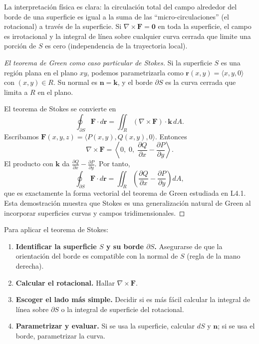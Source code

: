 \begin{rem}
La interpretación física es clara: la circulación total del campo alrededor del borde de una superficie es igual a la suma de las ``micro-circulaciones'' (el rotacional) a través de la superficie. Si $\nabla\times\mathbf{F}=\mathbf{0}$ en toda la superficie, el campo es irrotacional y la integral de línea sobre cualquier curva cerrada que limite una porción de $S$ es cero (independencia de la trayectoria local).
\end{rem}

\begin{proof}[El teorema de Green como caso particular de Stokes]
Si la superficie $S$ es una región plana en el plano $xy$, podemos parametrizarla como $\mathbf{r}(x,y)=\langle x,y,0\rangle$ con $(x,y)\in R$. Su normal es $\mathbf{n}=\mathbf{k}$, y el borde $\partial S$ es la curva cerrada que limita a $R$ en el plano. 
\par
El teorema de Stokes se convierte en
\[
\oint_{\partial S} \mathbf{F}\cdot d\mathbf{r}
=
\iint_R (\nabla\times\mathbf{F})\cdot\mathbf{k}\,dA.
\]
Escribamos $\mathbf{F}(x,y,z)=\langle P(x,y), Q(x,y), 0\rangle$. Entonces
\[
\nabla\times\mathbf{F}
=
\left\langle 0,\; 0,\; \frac{\partial Q}{\partial x}-\frac{\partial P}{\partial y} \right\rangle.
\]
El producto con $\mathbf{k}$ da $\frac{\partial Q}{\partial x}-\frac{\partial P}{\partial y}$. Por tanto,
\[
\oint_{\partial S} \mathbf{F}\cdot d\mathbf{r}
=
\iint_R \left( \frac{\partial Q}{\partial x}-\frac{\partial P}{\partial y} \right)dA,
\]
que es exactamente la forma vectorial del teorema de Green estudiada en L4.1. Esta demostración muestra que Stokes es una generalización natural de Green al incorporar superficies curvas y campos tridimensionales.
\end{proof}

\begin{pasos}
Para aplicar el teorema de Stokes:
\begin{enumerate}
\item \textbf{Identificar la superficie $S$ y su borde $\partial S$.} Asegurarse de que la orientación del borde es compatible con la normal de $S$ (regla de la mano derecha).
\item \textbf{Calcular el rotacional.} Hallar $\nabla\times\mathbf{F}$.
\item \textbf{Escoger el lado más simple.} Decidir si es más fácil calcular la integral de línea sobre $\partial S$ o la integral de superficie del rotacional.
\item \textbf{Parametrizar y evaluar.} Si se usa la superficie, calcular $dS$ y $\mathbf{n}$; si se usa el borde, parametrizar la curva.
\end{enumerate}
\end{pasos}

